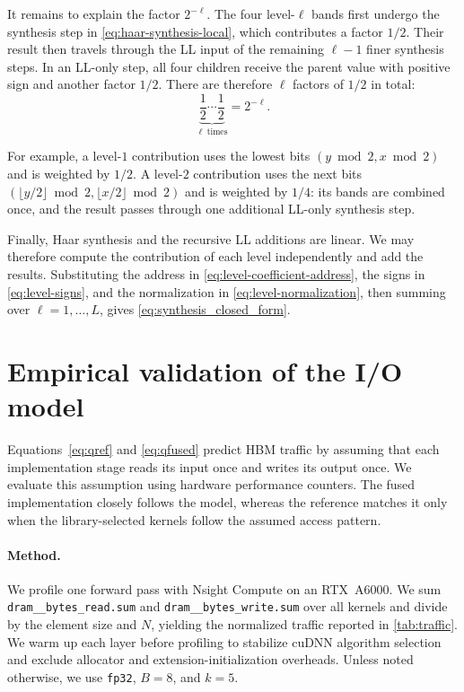 \documentclass[10pt]{article} %
\theoremstyle{plain}
\begin{document}
It remains to explain the factor $2^{-\ell}$.  The four level-$\ell$ bands
first undergo the synthesis step in \autoref{eq:haar-synthesis-local}, which
contributes a factor $1/2$.  Their result then travels through the LL input of
the remaining $\ell-1$ finer synthesis steps.  In an LL-only step, all four
children receive the parent value with positive sign and another factor
$1/2$.  There are therefore $\ell$ factors of $1/2$ in total:
\begin{equation}
\underbrace{\frac12\cdots\frac12}_{\ell\ \mathrm{times}}=2^{-\ell}.
\label{eq:level-normalization}
\end{equation}

For example, a level-$1$ contribution uses the lowest bits
$(y\bmod2,x\bmod2)$ and is weighted by $1/2$.  A level-$2$ contribution uses
the next bits $(\lfloor y/2\rfloor\bmod2,
\lfloor x/2\rfloor\bmod2)$ and is weighted by $1/4$: its bands are combined
once, and the result passes through one additional LL-only synthesis step.

Finally, Haar synthesis and the recursive LL additions are linear.  We may
therefore compute the contribution of each level independently and add the
results.  Substituting the address in
\autoref{eq:level-coefficient-address}, the signs in
\autoref{eq:level-signs}, and the normalization in
\autoref{eq:level-normalization}, then summing over
$\ell=1,\ldots,L$, gives \autoref{eq:synthesis_closed_form}.

\clearpage

\section{Empirical validation of the I/O model}
\label{app:traffic}

Equations~\autoref{eq:qref} and \autoref{eq:qfused} predict HBM traffic by
assuming that each implementation stage reads its input once and writes its
output once. We evaluate this assumption using hardware performance counters.
The fused implementation closely follows the model, whereas the reference
matches it only when the library-selected kernels follow the assumed access
pattern.

\paragraph{Method.}
We profile one forward pass with Nsight Compute on an RTX~A6000. We sum
\texttt{dram\_\_bytes\_read.sum} and
\texttt{dram\_\_bytes\_write.sum} over all kernels and divide by the element
size and $N$, yielding the normalized traffic reported in
\autoref{tab:traffic}. We warm up each layer before profiling to stabilize
cuDNN algorithm selection and exclude allocator and extension-initialization
overheads. Unless noted otherwise, we use \texttt{fp32}, $B{=}8$, and $k{=}5$.
\end{document}
